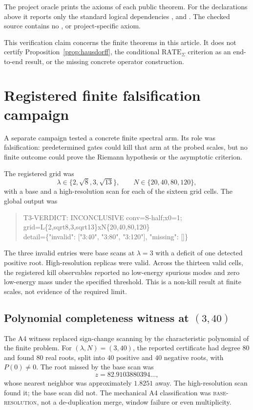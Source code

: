 \documentclass[11pt]{article}
\theoremstyle{definition}
\begin{document}
The project oracle prints the axioms of each public theorem.  For the
declarations above it reports only the standard logical dependencies
,  and .  The checked
source contains no ,  or project-specific axiom.

This verification claim concerns the finite theorems in this article.  It does
not certify Proposition~\ref{prop:hausdorff}, the conditional
$\mathrm{RATE}_{\Sigma}$ criterion as an end-to-end result, or the missing
concrete operator construction.

\section{Registered finite falsification campaign}

A separate campaign tested a concrete finite spectral arm.  Its role was
falsification: predetermined gates could kill that arm at the probed scales,
but no finite outcome could prove the Riemann hypothesis or the asymptotic
criterion.

The registered grid was
\[
 \lambda\in\{2,\sqrt8,3,\sqrt{13}\},
 \qquad
 N\in\{20,40,80,120\},
\]
with a base and a high-resolution scan for each of the sixteen grid cells.
The global output was
\begin{quote}\small\ttfamily
T3-VERDICT: INCONCLUSIVE conv=S-half;x0=1;\\
grid=L\{2,sqrt8,3,sqrt13\}xN\{20,40,80,120\}\\
detail=\{"invalid": ["3:40", "3:80", "3:120"], "missing": []\}
\end{quote}
The three invalid entries were base scans at $\lambda=3$ with a deficit of
one detected positive root.  High-resolution replicas were valid.  Across the
thirteen valid cells, the registered kill observables reported no low-energy
spurious modes and zero low-energy mass under the specified threshold.  This
is a non-kill result at finite scales, not evidence of the required limit.

\subsection{Polynomial completeness witness at
  \texorpdfstring{$(3,40)$}{(3,40)}}

The A4 witness replaced sign-change scanning by the characteristic polynomial
of the finite problem.  For $(\lambda,N)=(3,40)$, the reported certificate had
degree $80$ and found $80$ real roots, split into $40$ positive and $40$
negative roots, with $P(0)\neq0$.  The root missed by the base scan was
\[
 z=82.9103880394\ldots,
\]
whose nearest neighbor was approximately $1.8251$ away.  The high-resolution
scan found it; the base scan did not.  The mechanical A4 classification was
\textsc{base-resolution}, not a de-duplication merge, window failure or even
multiplicity.
\end{document}
